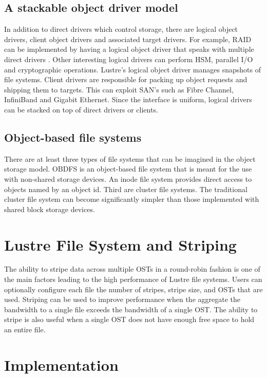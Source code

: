 \documentclass[9pt,twocolumn,twoside]{styles/osajnl}
\begin{document}
\subsection{A stackable object driver model}
In addition to direct drivers which control storage, there are logical
object drivers, client object drivers and associated target
drivers. For example, RAID can be implemented by having a logical
object driver that speaks with multiple direct drivers
\cite{www-whatislustre}. Other interesting logical drivers can perform
HSM, parallel I/O and cryptographic operations. Lustre’s logical
object driver manages snapshots of file systems. Client drivers are
responsible for packing up object requests and shipping them to
targets. This can exploit SAN's such as Fibre Channel, InfiniBand and
Gigabit Ethernet. Since the interface is uniform, logical drivers can
be stacked on top of direct drivers or clients.

\subsection{Object-based file systems}
There are at least three types of file systems that can be imagined in
the object storage model. OBDFS is an object-based file system that is
meant for the use with non-shared storage devices. An inode file
system provides direct access to objects named by an object id. Third
are cluster file systems. The traditional cluster file system can
become significantly simpler than those implemented with shared block
storage devices.

\section{Lustre File System and Striping}
The ability to stripe data across multiple OSTs in a round-robin
fashion is one of the main factors leading to the high performance of
Lustre file systems. Users can optionally configure each file the
number of stripes, stripe size, and OSTs that are used. Striping can
be used to improve performance when the aggregate the bandwidth to a
single file exceeds the bandwidth of a single OST. The ability to
stripe is also useful when a single OST does not have enough free
space to hold an entire file.

\section{Implementation}
\end{document}

